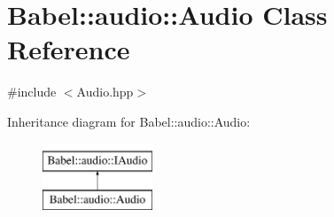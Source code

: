 \hypertarget{classBabel_1_1audio_1_1Audio}{}\section{Babel\+:\+:audio\+:\+:Audio Class Reference}
\label{classBabel_1_1audio_1_1Audio}


{\ttfamily \#include $<$Audio.\+hpp$>$}

Inheritance diagram for Babel\+:\+:audio\+:\+:Audio\+:\begin{figure}[H]
\begin{center}
\leavevmode
\includegraphics[height=2.000000cm]{classBabel_1_1audio_1_1Audio}
\end{center}
\end{figure}
